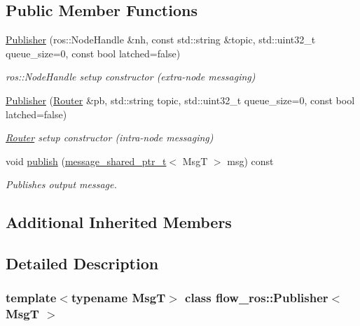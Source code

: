 \subsection*{Public Member Functions}
\begin{DoxyCompactItemize}
\item 
\hyperlink{classflow__ros_1_1_publisher_a51a76fa72d57c38e23857c0c95103ef4}{Publisher} (ros\+::\+Node\+Handle \&nh, const std\+::string \&topic, std\+::uint32\+\_\+t queue\+\_\+size=0, const bool latched=false)
\begin{DoxyCompactList}\small\item\em {\ttfamily ros\+::\+Node\+Handle} setup constructor (extra-\/node messaging) \end{DoxyCompactList}\item 
\hyperlink{classflow__ros_1_1_publisher_a2a5c14b45b30efa5227c6b5b2586ab7e}{Publisher} (\hyperlink{classflow__ros_1_1_router}{Router} \&pb, std\+::string topic, std\+::uint32\+\_\+t queue\+\_\+size=0, const bool latched=false)
\begin{DoxyCompactList}\small\item\em {\ttfamily \hyperlink{classflow__ros_1_1_router}{Router}} setup constructor (intra-\/node messaging) \end{DoxyCompactList}\item 
void \hyperlink{classflow__ros_1_1_publisher_abba3d43e5dfe0bc1690fd4980e2f927f}{publish} (\hyperlink{namespaceflow__ros_a21a684f38ee2083b3858613317c46d82}{message\+\_\+shared\+\_\+ptr\+\_\+t}$<$ MsgT $>$ msg) const
\begin{DoxyCompactList}\small\item\em Publishes output message. \end{DoxyCompactList}\end{DoxyCompactItemize}
\subsection*{Additional Inherited Members}


\subsection{Detailed Description}
\subsubsection*{template$<$typename MsgT$>$\newline
class flow\+\_\+ros\+::\+Publisher$<$ Msg\+T $>$}

